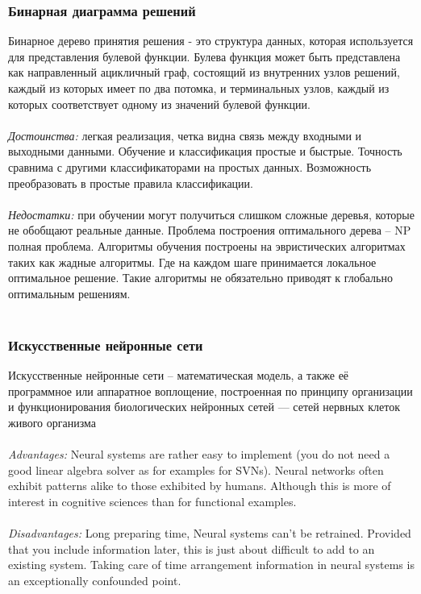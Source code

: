 \documentclass[14pt]{extarticle}
\begin{document}
\subsubsection{Бинарная диаграмма решений}
Бинарное дерево принятия решения - это структура данных, которая используется для представления булевой функции. Булева функция может быть представлена как направленный ацикличный граф, состоящий из внутренних узлов решений, каждый из которых имеет по два потомка, и терминальных узлов, каждый из которых соответствует одному из значений булевой функции.
\\
\\
\emph{Достоинства:} легкая реализация, четка видна связь между входными и выходными данными. Обучение и классификация простые и быстрые. Точность сравнима с другими классификаторами на простых данных. Возможность преобразовать в простые правила классификации.
\\
\\
\emph{Недостатки:} при обучении могут получиться слишком сложные деревья, которые не обобщают реальные данные. Проблема построения оптимального дерева – NP полная проблема. Алгоритмы обучения построены на эвристических алгоритмах таких как жадные алгоритмы. Где на каждом шаге принимается локальное оптимальное решение. Такие алгоритмы не обязательно приводят к глобально оптимальным решениям.
\\
\\
\subsubsection{Искусственные нейронные сети}
Искусственные нейронные сети – математическая модель, а также её программное или аппаратное воплощение, построенная по принципу организации и функционирования биологических нейронных сетей — сетей нервных клеток живого организма
\\
\\
\emph{Advantages:} Neural systems are rather easy to implement (you do not need a good linear algebra solver as for examples for SVNs). Neural networks often exhibit patterns alike to those exhibited by humans. Although this is more of interest in cognitive sciences than for functional examples.
\\
\\
\emph{Disadvantages:} Long preparing time, Neural systems can't be retrained. Provided that you include information later, this is just about difficult to add to an existing system. Taking care of time arrangement information in neural systems is an exceptionally confounded point.
\\
\end{document}
